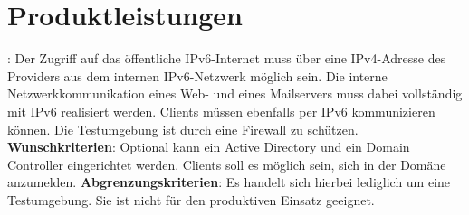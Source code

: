 \section{Produktleistungen}

: Der Zugriff auf das öffentliche IPv6-Internet muss über eine IPv4-Adresse des Providers aus dem internen IPv6-Netzwerk möglich sein. Die interne Netzwerkkommunikation eines Web- und eines Mailservers muss dabei vollständig mit IPv6 realisiert werden. Clients müssen ebenfalls per IPv6 kommunizieren können. Die Testumgebung ist durch eine Firewall zu schützen. {\bf Wunschkriterien}: Optional kann ein Active Directory und ein Domain Controller eingerichtet werden. Clients soll es möglich sein, sich in der Domäne anzumelden. {\bf Abgrenzungskriterien}: Es handelt sich hierbei lediglich um eine Testumgebung. Sie ist nicht für den produktiven Einsatz geeignet.